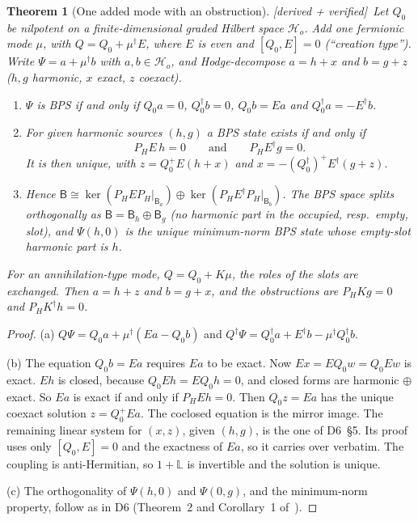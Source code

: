 \documentclass[11pt]{article}
\newcommand{\Hc}{\mathcal H}
\newcommand{\B}{\mathsf B}
\newcommand{\PH}{P_{\!H}}
\newcommand{\tagbox}[2]{\textsf{\small\color{#1}[#2]}}
\newcommand{\VER}{\tagbox{cder}{derived + verified}}
\theoremstyle{plain}
\newtheorem{theorem}{Theorem}
\theoremstyle{remark}
\numberwithin{equation}{section}
\begin{document}
\begin{theorem}[One added mode with an obstruction]\label{thm:A}\VER\
Let $Q_0$ be nilpotent on a finite-dimensional graded Hilbert space $\Hc_o$. Add one fermionic mode $\mu$, with
$Q=Q_0+\mu^\dagger E$, where $E$ is even and $[Q_0,E]=0$ (``creation type''). Write $\Psi=a+\mu^\dagger b$ with
$a,b\in\Hc_o$, and Hodge-decompose $a=h+x$ and $b=g+z$ ($h,g$ harmonic, $x$ exact, $z$ coexact).
\begin{enumerate}\itemsep2pt
\item[(a)] $\Psi$ is BPS if and only if $Q_0a=0$, $Q_0^\dagger b=0$, $Q_0b=Ea$ and $Q_0^\dagger a=-E^\dagger b$.
\item[(b)] For given harmonic sources $(h,g)$ a BPS state exists if and only if
  \begin{equation}\label{eq:obstruction}
  \PH E\,h=0\qquad\text{and}\qquad \PH E^\dagger g=0 .
  \end{equation}
  It is then unique, with $z=Q_0^+E(h+x)$ and $x=-(Q_0^\dagger)^+E^\dagger(g+z)$.
\item[(c)] Hence $\B\cong\ker(\PH E\PH|_{\B_a})\oplus\ker(\PH E^\dagger\PH|_{\B_b})$. The BPS space splits orthogonally
  as $\B=\B_h\oplus\B_g$ (no harmonic part in the occupied, resp.\ empty, slot), and $\Psi(h,0)$ is the unique
  minimum-norm BPS state whose empty-slot harmonic part is $h$.
\end{enumerate}
For an annihilation-type mode, $Q=Q_0+K\mu$, the roles of the slots are exchanged. Then $a=h+z$ and $b=g+x$, and the
obstructions are $\PH Kg=0$ and $\PH K^\dagger h=0$.
\end{theorem}
\begin{proof}
(a) $Q\Psi=Q_0a+\mu^\dagger(Ea-Q_0b)$ and $Q^\dagger\Psi=Q_0^\dagger a+E^\dagger b-\mu^\dagger Q_0^\dagger b$.

(b) The equation $Q_0b=Ea$ requires $Ea$ to be exact. Now $Ex=EQ_0w=Q_0Ew$ is exact. $Eh$ is closed, because
$Q_0Eh=EQ_0h=0$, and closed forms are harmonic $\oplus$ exact. So $Ea$ is exact if and only if $\PH Eh=0$. Then
$Q_0z=Ea$ has the unique coexact solution $z=Q_0^+Ea$. The coclosed equation is the mirror image. The remaining linear
system for $(x,z)$, given $(h,g)$, is the one of D6~\S5. Its proof uses only $[Q_0,E]=0$ and the exactness of $Ea$, so
it carries over verbatim. The coupling is anti-Hermitian, so $1+\mathbb L$ is invertible and the solution is unique.

(c) The orthogonality of $\Psi(h,0)$ and $\Psi(0,g)$, and the minimum-norm property, follow as in D6 (Theorem~2 and
Corollary~1 of~\cite{prog1013}).
\end{proof}
\end{document}
